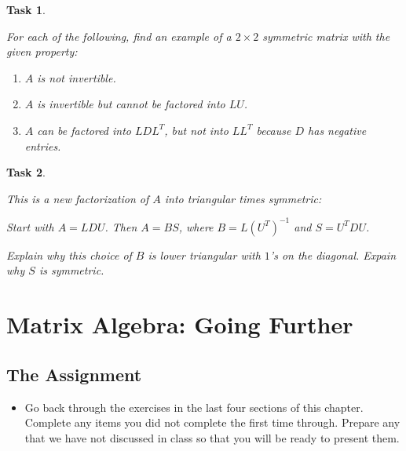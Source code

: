 \documentclass[10pt,]{book}
\theoremstyle{plain}
\numberwithin{equation}{section}
\newtheorem{task}{Task}[chapter]
\begin{document}
\begin{task}
\label{task-80}

        For each of the following, find an example of a \(2\times 2\)
        symmetric matrix with the given property:
        \begin{enumerate}
\item{} \(A\) is not invertible.\item{} \(A\) is invertible but cannot be factored into \(LU\).\item{}
            \(A\) can be factored into \(LDL^T\), but not into
            \(LL^T\) because \(D\) has negative entries.
          \end{enumerate}
\end{task}
\begin{task}
\label{task-81}

          This is a new factorization of \(A\) into \emph{triangular
          times symmetric}:
\par

          Start with \(A = LDU\). Then \(A = B S\),
          where \(B = L\left(U^T\right)^{-1}\) and \(S = U^T D U\).
\par

          Explain why this choice of \(B\) is lower triangular with
          \(1\)'s on the diagonal. Expain why \(S\) is symmetric.
\end{task}
\clearpage
\typeout{************************************************}
\typeout{************************************************}
\section[Matrix Algebra: Going Further]{Matrix Algebra: Going Further}\label{lin-eq-gf2}
\typeout{************************************************}
\typeout{************************************************}
\subsection[The Assignment]{The Assignment}\label{subsection-56}
\begin{itemize}
\item{}
      Go back through the exercises in the last four sections of this chapter.
      Complete any items you
      did not complete the first time through. Prepare any that we have not
      discussed in class so that you will be ready to present them.
    \end{itemize}
\typeout{************************************************}
\typeout{************************************************}
\end{document}
